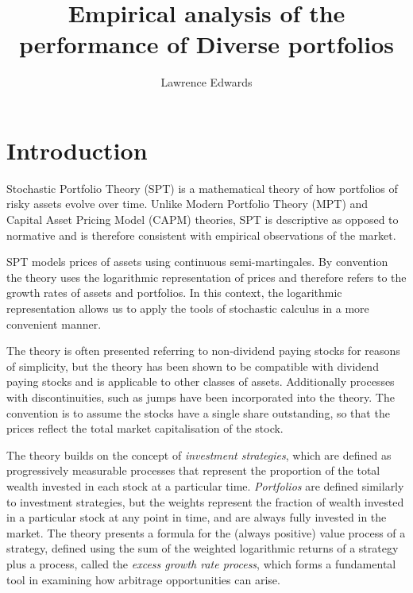 \documentclass[british]{amsart} \usepackage{lmodern}
\numberwithin{equation}{section} \numberwithin{figure}{section}
\theoremstyle{plain} \newtheorem{thm}{\protect\theoremname}[section]
\theoremstyle{definition} \newtheorem{defn}[thm]{\protect\definitionname}
\theoremstyle{plain} \newtheorem{assumption}[thm]{\protect\assumptionname}
\theoremstyle{plain} \newtheorem{lem}[thm]{\protect\lemmaname}
\theoremstyle{plain} \newtheorem{prop}[thm]{\protect\propositionname}
\theoremstyle{remark} \newtheorem{rem}[thm]{\protect\remarkname}
\theoremstyle{plain} \newtheorem{cor}[thm]{\protect\corollaryname}
\begin{document}
\title{Empirical analysis of the performance of Diverse portfolios}
\author{Lawrence Edwards} \maketitle

\newpage

\tableofcontents{}

\listoftables

\newpage

\section{Introduction}

Stochastic Portfolio Theory (SPT) is a mathematical theory of how portfolios of
risky assets evolve over time. Unlike Modern Portfolio Theory (MPT) and Capital
Asset Pricing Model (CAPM) theories, SPT is descriptive as opposed to normative
and is therefore consistent with empirical observations of the market.

SPT models prices of assets using continuous semi-martingales. By convention the
theory uses the logarithmic representation of prices and therefore refers to the
growth rates of assets and portfolios. In this context, the logarithmic
representation allows us to apply the tools of stochastic calculus in a more
convenient manner. 

The theory is often presented referring to non-dividend paying stocks for
reasons of simplicity, but the theory has been shown to be compatible with
dividend paying stocks and is applicable to other classes of assets.
Additionally processes with discontinuities, such as jumps have been
incorporated into the theory. The convention is to assume the stocks have a
single share outstanding, so that the prices reflect the total market
capitalisation of the stock.

The theory builds on the concept of \textit{investment strategies}, which are
defined as progressively measurable processes that represent the proportion of
the total wealth invested in each stock at a particular time.
\textit{Portfolios} are defined similarly to investment strategies, but 
the weights represent the fraction of wealth invested in a particular stock at
any point in time, and are always fully invested in the market. The theory
presents a formula for the (always positive) value process of a strategy,
defined using the sum of the weighted logarithmic returns of a strategy plus a
process, called the \textit{excess growth rate process}, which forms a
fundamental tool in examining how arbitrage opportunities can arise.
\end{document}
